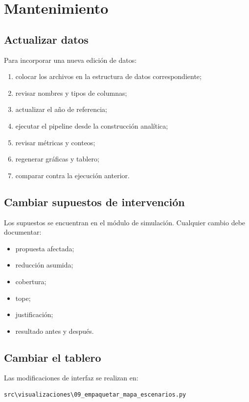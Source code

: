 \documentclass[11pt,a4paper]{article}
\begin{document}
\section{Mantenimiento}

\subsection{Actualizar datos}

Para incorporar una nueva edición de datos:

\begin{enumerate}
    \item colocar los archivos en la estructura de datos correspondiente;
    \item revisar nombres y tipos de columnas;
    \item actualizar el año de referencia;
    \item ejecutar el pipeline desde la construcción analítica;
    \item revisar métricas y conteos;
    \item regenerar gráficas y tablero;
    \item comparar contra la ejecución anterior.
\end{enumerate}

\subsection{Cambiar supuestos de intervención}

Los supuestos se encuentran en el módulo de simulación. Cualquier cambio debe documentar:

\begin{itemize}
    \item propuesta afectada;
    \item reducción asumida;
    \item cobertura;
    \item tope;
    \item justificación;
    \item resultado antes y después.
\end{itemize}

\subsection{Cambiar el tablero}

Las modificaciones de interfaz se realizan en:

\begin{lstlisting}[style=terminal]
src\visualizaciones\09_empaquetar_mapa_escenarios.py
\end{lstlisting}
\end{document}
